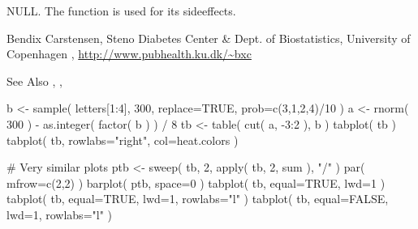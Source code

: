 \begin{Value}
NULL. The function is used for its sideeffects.
\end{Value}
\begin{Author}\relax
Bendix Carstensen, Steno Diabetes Center \& Dept. of Biostatistics,
University of Copenhagen
,
\url{http://www.pubhealth.ku.dk/~bxc}
\end{Author}
\begin{SeeAlso}\relax
See Also , ,
\end{SeeAlso}
\begin{Examples}
\begin{ExampleCode}
b <- sample( letters[1:4], 300, replace=TRUE, prob=c(3,1,2,4)/10 )
a <- rnorm( 300 ) - as.integer( factor( b ) ) / 8
tb <- table( cut( a, -3:2 ), b )
tabplot( tb )
tabplot( tb, rowlabs="right", col=heat.colors )

# Very similar plots
ptb <- sweep( tb, 2, apply( tb, 2, sum ), "/" )
par( mfrow=c(2,2) )
barplot( ptb, space=0 )
tabplot( tb, equal=TRUE, lwd=1 )
tabplot( tb, equal=TRUE, lwd=1, rowlabs="l" )
tabplot( tb, equal=FALSE, lwd=1, rowlabs="l" )
\end{ExampleCode}
\end{Examples}

